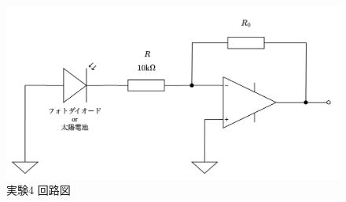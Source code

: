 \begin{figure}[!htb]
	\centering
	\includegraphics[width=0.6\linewidth]{src/figures/exp4/circuit.png}
	\caption{実験4 回路図}\label{fig:exp4-circuit}
\end{figure}
